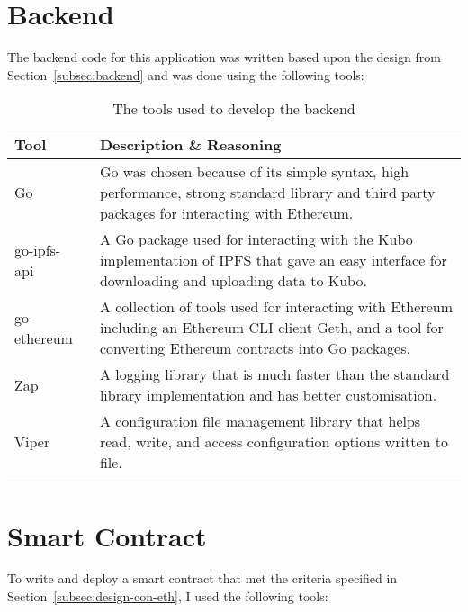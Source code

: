 
\section{Backend}

The backend code for this application was written based upon the design from Section~\ref{subsec:backend} and was done using the following tools:

\begin{longtable}{p{} p{}}
  \toprule
  \textbf{Tool} & \textbf{Description \& Reasoning}
  \\\midrule\midrule
  Go~\cite{noauthor_go_nodate}
  & Go was chosen because of its simple syntax, high performance, strong standard library and third party packages for interacting with Ethereum.
  \\
  go-ipfs-api~\cite{noauthor_go-ipfs-api_2023}
  & A Go package used for interacting with the Kubo implementation of IPFS that gave an easy interface for downloading and uploading data to Kubo.\\
  go-ethereum~\cite{noauthor_go-ethereum_nodate}
  & A collection of tools used for interacting with Ethereum including an Ethereum CLI client Geth, and a tool for converting Ethereum contracts into Go packages.\\
  Zap~\cite{noauthor_zap_2023}
  & A logging library that is much faster than the standard library implementation and has better customisation. \\
  Viper~\cite{noauthor_viper_nodate}
  & A configuration file management library that helps read, write, and access configuration options written to file.
  \\\bottomrule\bottomrule
  \caption{The tools used to develop the backend}
\end{longtable}

\section{Smart Contract}

To write and deploy a smart contract that met the criteria specified in Section~\ref{subsec:design-con-eth}, I used the following tools:

